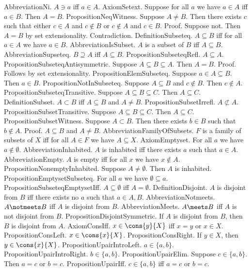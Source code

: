 AbbreviationNi. $A \ni a$ iff $a \in A$.
AxiomSetext. Suppose for all $a$ we have $a \in A$ iff $a \in B$. Then $A = B$.
PropositionNeqWitness. Suppose $A \neq B$. Then there exists $c$ such that either $c \in A$ and $c \not \in B$ or $c \not \in A$ and $c \in B$.
Proof. Suppose not. Then $A = B$ by set extensionality. Contradiction.
DefinitionSubseteq. $A \subseteq B$ iff for all $a \in A$ we have $a \in B$.
AbbreviationIsSubset. $A$ is a subset of $B$ iff $A \subseteq B$.
AbbreviationSupseteq. $B \supseteq A$ iff $A \subseteq B$.
PropositionSubseteqRefl. $A \subseteq A$.
PropositionSubseteqAntisymmetric. Suppose $A \subseteq B \subseteq A$. Then $A = B$.
Proof. Follows by set extensionality.
PropositionElemSubseteq. Suppose $a \in A \subseteq B$. Then $a \in B$.
PropositionNotInSubseteq. Suppose $A \subseteq B$ and $c \notin B$. Then $c \notin A$.
PropositionSubseteqTransitive. Suppose $A \subseteq B \subseteq C$. Then $A \subseteq C$.
DefinitionSubset. $A \subset B$ iff $A \subseteq B$ and $A \neq B$.
PropositionSubsetIrrefl. $A \not \subset A$.
PropositionSubsetTransitive. Suppose $A \subseteq B \subseteq C$. Then $A \subseteq C$.
PropositionSubsetWitness. Suppose $A \subset B$. Then there exists $b \in B$ such that $b \notin A$.
Proof. $A \subseteq B$ and $A \neq B$.
AbbreviationFamilyOfSubsets. $F$ is a family of subsets of $X$ iff for all $A \in F$ we have $A \subseteq X$.
AxiomEmptyset. For all $a$ we have $a \notin \emptyset$.
AbbreviationInhabited. $A$ is inhabited iff there exists $a$ such that $a \in A$.
AbbreviationEmpty. $A$ is empty iff for all $x$ we have $x \notin A$.
PropositionNonemptyInhabited. Suppose $A \neq \emptyset$. Then $A$ is inhabited.
PropositionEmptysetSubseteq. For all $a$ we have $ \emptyset \subseteq a$.
PropositionSubseteqEmptysetIff. $A \subseteq \emptyset$ iff $A = \emptyset$.
DefinitionDisjoint. $A$ is disjoint from $B$ iff there exists no $a$ such that $a \in A, B$.
AbbreviationNotmeets. $A \notmeets B$ iff $A$ is disjoint from $B$.
AbbreviationMeets. $A \meets B$ iff $A$ is not disjoint from $B$.
PropositionDisjointSymmetric. If $A$ is disjoint from $B$, then $B$ is disjoint from $A$.
AxiomConsIff. $x \in \cons{y}{X}$ iff $x = y$ or $x \in X$.
PropositionConsLeft. $x \in \cons{x}{X}$.
PropositionConsRight. If $y \in X$, then $y \in \cons{x}{X}$.
PropositionUpairIntroLeft. $a \in \{a,b \}$.
PropositionUpairIntroRight. $b \in \{a,b \}$.
PropositionUpairElim. Suppose $c \in \{a,b \}$. Then $a = c$ or $b = c$.
PropositionUpairIff. $c \in \{a,b \}$ iff $a = c$ or $b = c$.
